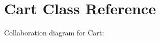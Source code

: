 \hypertarget{classCart}{}\section{Cart Class Reference}
\label{classCart}


Collaboration diagram for Cart\+:
